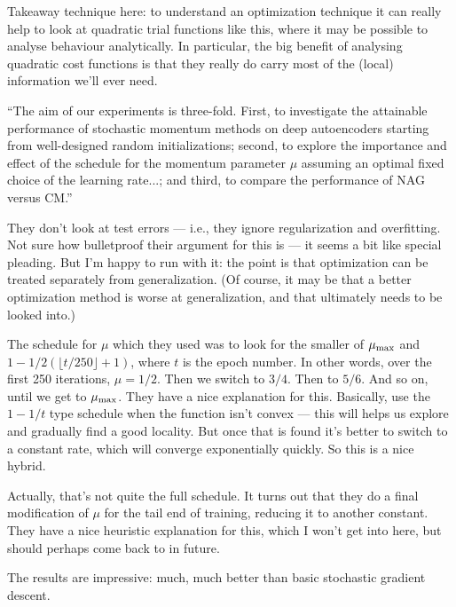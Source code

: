 \documentclass[12pt]{report}
\begin{document}
Takeaway technique here: to understand an optimization technique it
can really help to look at quadratic trial functions like this, where
it may be possible to analyse behaviour analytically.  In particular,
the big benefit of analysing quadratic cost functions is that they
really do carry most of the (local) information we'll ever need.

``The aim of our experiments is three-fold.  First, to investigate the
attainable performance of stochastic momentum methods on deep
autoencoders starting from well-designed random initializations;
second, to explore the importance and effect of the schedule for the
momentum parameter $\mu$ assuming an optimal fixed choice of the
learning rate...; and third, to compare the performance of NAG versus
CM.''

They don't look at test errors --- i.e., they ignore regularization
and overfitting.  Not sure how bulletproof their argument for this is
--- it seems a bit like special pleading.  But I'm happy to run with
it: the point is that optimization can be treated separately from
generalization.  (Of course, it may be that a better optimization
method is worse at generalization, and that ultimately needs to be
looked into.)

The schedule for $\mu$ which they used was to look for the smaller of
$\mu_{\rm max}$ and $1-1/2(\lfloor t/250 \rfloor +1)$, where $t$ is
the epoch number.  In other words, over the first 250 iterations, $\mu
= 1/2$.  Then we switch to $3/4$.  Then to $5/6$.  And so on, until we
get to $\mu_{\rm max}$.  They have a nice explanation for this.
Basically, use the $1-1/t$ type schedule when the function isn't
convex --- this will helps us explore and gradually find a good
locality.  But once that is found it's better to switch to a constant
rate, which will converge exponentially quickly.  So this is a nice
hybrid.  

Actually, that's not quite the full schedule.  It turns out that they
do a final modification of $\mu$ for the tail end of training,
reducing it to another constant.  They have a nice heuristic
explanation for this, which I won't get into here, but should perhaps
come back to in future.

The results are impressive: much, much better than basic stochastic
gradient descent.
\end{document}
